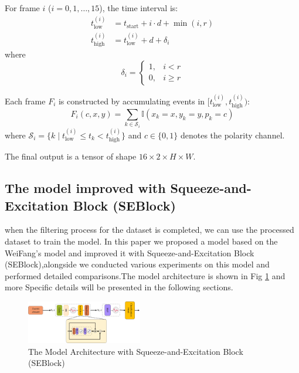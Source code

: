\documentclass[conference]{IEEEtran}
\begin{document}
For frame $i$ ($i = 0, 1, \ldots, 15$), the time interval is:
\begin{align}
t_{\text{low}}^{(i)} &= t_{\text{start}} + i \cdot d + \min(i, r) \\
t_{\text{high}}^{(i)} &= t_{\text{low}}^{(i)} + d + \delta_i
\end{align}
where
\begin{equation}
\delta_i =
\begin{cases}
1, & i < r \\
0, & i \geq r
\end{cases}
\end{equation}

Each frame $F_i$ is constructed by accumulating events in $[t_{\text{low}}^{(i)}, t_{\text{high}}^{(i)})$:
\begin{equation}
F_i(c, x, y) = \sum_{k \in \mathcal{S}_i} \mathbb{I}(x_k = x, y_k = y, p_k = c)
\end{equation}
where $\mathcal{S}_i = \{k \mid t_{\text{low}}^{(i)} \leq t_k < t_{\text{high}}^{(i)}\}$ and $c \in \{0, 1\}$ denotes the polarity channel.

The final output is a tensor of shape $16 \times 2 \times H \times W$.

\subsection{The model improved with Squeeze-and-Excitation Block (SEBlock)}
when the filtering process for the dataset is completed, we can use the processed dataset to train the model. In this paper we proposed a model based on the WeiFang's model\cite{fang2021} and improved it with Squeeze-and-Excitation Block (SEBlock)\cite{hu2019},alongside we conducted various experiments on this model and performed detailed comparisons.The model architecture is shown in Fig \ref{fig:model} and more Specific details will be presented in the following sections.
\begin{figure}[htbp]
    \centering
    \includegraphics[width=0.45\textwidth]{figure/model.png}
    \caption{The Model Architecture with Squeeze-and-Excitation Block (SEBlock)}
    \label{fig:model}
\end{figure}
\end{document}

